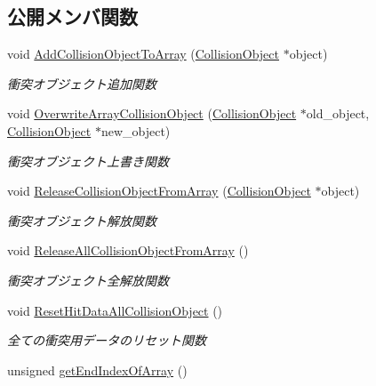 \subsection*{公開メンバ関数}
\begin{DoxyCompactItemize}
\item 
void \mbox{\hyperlink{class_collision_objects_a50d6593f98cd04e23ad7ea9102eccc3c}{Add\+Collision\+Object\+To\+Array}} (\mbox{\hyperlink{class_collision_object}{Collision\+Object}} $\ast$object)
\begin{DoxyCompactList}\small\item\em 衝突オブジェクト追加関数 \end{DoxyCompactList}\item 
void \mbox{\hyperlink{class_collision_objects_aed8d6903485ae775d8bbff511796a653}{Overwrite\+Array\+Collision\+Object}} (\mbox{\hyperlink{class_collision_object}{Collision\+Object}} $\ast$old\+\_\+object, \mbox{\hyperlink{class_collision_object}{Collision\+Object}} $\ast$new\+\_\+object)
\begin{DoxyCompactList}\small\item\em 衝突オブジェクト上書き関数 \end{DoxyCompactList}\item 
void \mbox{\hyperlink{class_collision_objects_a38bfe55a93549c90d416c0d1d560932b}{Release\+Collision\+Object\+From\+Array}} (\mbox{\hyperlink{class_collision_object}{Collision\+Object}} $\ast$object)
\begin{DoxyCompactList}\small\item\em 衝突オブジェクト解放関数 \end{DoxyCompactList}\item 
void \mbox{\hyperlink{class_collision_objects_a2efe32f283fe9b2a30ff8d1e370f152d}{Release\+All\+Collision\+Object\+From\+Array}} ()
\begin{DoxyCompactList}\small\item\em 衝突オブジェクト全解放関数 \end{DoxyCompactList}\item 
void \mbox{\hyperlink{class_collision_objects_a01ffe9567540a819f19cd66f96981b47}{Reset\+Hit\+Data\+All\+Collision\+Object}} ()
\begin{DoxyCompactList}\small\item\em 全ての衝突用データのリセット関数 \end{DoxyCompactList}\item 
unsigned \mbox{\hyperlink{class_collision_objects_a309eef4695b4a19f389eaf5d0753c256}{get\+End\+Index\+Of\+Array}} ()

\end{DoxyCompactItemize}
